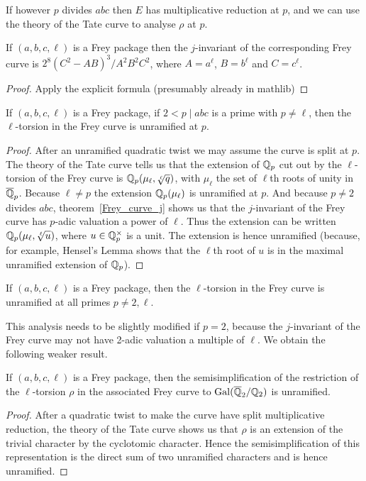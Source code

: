 If however $p$ divides $abc$ then $E$ has multiplicative 
reduction at $p$, and we can use the theory of the Tate curve to analyse $\rho$ at $p$.

\begin{theorem}\label{Frey_curve_j} If $(a,b,c,\ell)$ is a Frey package then the $j$-invariant of the corresponding Frey curve is $2^8(C^2-AB)^3/A^2B^2C^2$, where $A=a^\ell$, $B=b^\ell$ and $C=c^\ell$.
\end{theorem}
\begin{proof}
  Apply the explicit formula (presumably already in mathlib)
\end{proof}

\begin{corollary}\label{Frey_curve_unram} If $(a,b,c,\ell)$ is a Frey package, if $2<p\mid abc$
  is a prime with $p\not=\ell$, then the $\ell$-torsion in the Frey curve is unramified
  at $p$.
\end{corollary}
\begin{proof} After an unramified quadratic twist we may assume the curve is split at $p$.
  The theory of the Tate curve tells us that the extension of $\mathbb{Q}_p$ cut out by the $\ell$-torsion
  of the Frey curve is $\mathbb{Q}_p(\mu_\ell,\sqrt[\ell]{q})$, with $\mu_\ell$ the set of $\ell$th roots
  of unity in $\overline{\mathbb{Q}}_p$. Because $\ell\not=p$ the extension
  $\mathbb{Q}_p(\mu_\ell)$ is unramified at $p$. And because $p\not=2$ divides $abc$, 
  theorem~\ref{Frey_curve_j} shows us that the $j$-invariant of the Frey curve has $p$-adic
  valuation a power of $\ell$. Thus the extension can be written $\mathbb{Q}_p(\mu_\ell,\sqrt[\ell]{u})$,
  where $u\in\mathbb{Q}_p^\times$ is a unit. The extension is hence unramified (because, for example,
  Hensel's Lemma shows that the $\ell$th root of $u$ is in the maximal unramified
  extension of $\mathbb{Q}_p$).
\end{proof}

\begin{corollary}\label{frey_curve_unramified} If $(a,b,c,\ell)$ is a Frey package, then the $\ell$-torsion in the Frey curve is unramified at all primes $p\not=2,\ell$.
\end{corollary}

This analysis needs to be slightly modified if $p=2$, because the $j$-invariant of
the Frey curve may not have 2-adic valuation a multiple of $\ell$. We obtain the
following weaker result.

\begin{corollary}\label{frey_curve_at_2} If $(a,b,c,\ell)$ is a Frey package, then the 
  semisimplification of the restriction of the $\ell$-torsion $\rho$ in the associated Frey curve 
  to $\operatorname{Gal}(\overline{\mathbb{Q}}_2/\mathbb{Q}_2)$ is unramified.
\end{corollary}
\begin{proof} After a quadratic twist to make the curve have split multiplicative
  reduction, the theory of the Tate curve shows us that $\rho$ is an extension
  of the trivial character by the cyclotomic character. Hence the semisimplification of this representation is the direct sum of two
  unramified characters and is hence unramified.
\end{proof}

